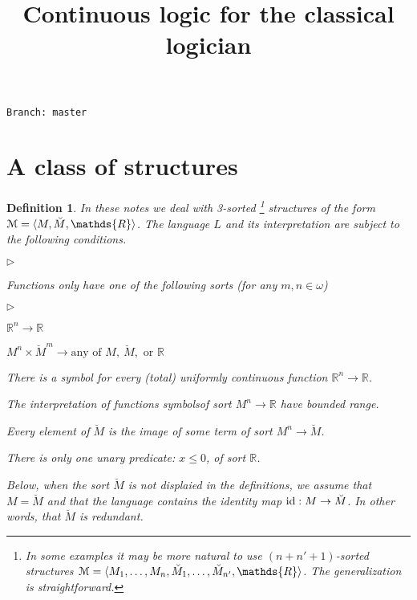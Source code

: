 \documentclass[12pt,letterpaper,oneside,reqno]{amsart}
\newcommand{\mylabel}[1]{{#1}\hfill}
\renewenvironment{itemize}
  {\begin{list}{$\triangleright$}{%
   \setlength{\parskip}{0mm}
   \setlength{\topsep}{.2\baselineskip}
   \setlength{\rightmargin}{0mm}
   \setlength{\listparindent}{0mm}
   \setlength{\itemindent}{0mm}
   \setlength{\labelwidth}{3ex}
   \setlength{\itemsep}{.2\baselineskip}
   \setlength{\parsep}{.2\baselineskip}
   \setlength{\partopsep}{0mm}
   \setlength{\labelsep}{1ex}
   \setlength{\leftmargin}{\labelwidth+\labelsep}
   \let\makelabel\mylabel}}{%
   \end{list}}
\theoremstyle{plain}
\newtheorem{definition}[theorem]{Definition}
\theoremstyle{remark}
\begin{document}
\title{Continuous logic for the classical logician}
\hfill\texttt{Branch:\ master\ \DTMnow}\bigskip
\maketitle
\raggedbottom
\section{A class of structures}\label{uno}


\def\ceq#1#2#3{\parbox[t]{28ex}{$\displaystyle #1$}\parbox{6ex}{\hfil $#2$}{$\displaystyle #3$}}

\begin{definition}\label{def_1}
  In these notes we deal with 3-sorted%
  \footnote{In some examples it may be more natural to use $(n+n'+1)$-sorted structures ${\EuScript M}=\langle  M_1,\dots, M_n,\breve M_1,\dots,\breve M_{n'},\mathds{R}\rangle$. The generalization is straightforward.}
  structures of the form ${\EuScript M}=\langle  M,\breve M,\mathds{R}\rangle$.
  The language $L$ and its interpretation are subject to the following conditions.
  \begin{itemize}
  \item[1.] Functions only have one of the following sorts (for any $m,n\in\omega$)
  \begin{itemize}
    \item[a.] $\mathds{R}^n\to\mathds{R}$
    \item[b.] $ M^n\times{\breve M}^m\to\textrm{any of }  M,\ \breve M,\textrm{ or }\mathds{R}$
  \end{itemize}
  \item[2.] There is a symbol for every (total) uniformly continuous function $\mathds{R}^n\to\mathds{R}$.
  \item[3.] The interpretation of functions symbolsof sort $M^n\to\mathds{R}$ have \textit{bounded\/} range.
  \item[4.] Every element of $\breve M$ is the image of some term of sort $ M^n\to \breve M$.  
  \item[5.] There is only one unary predicate: $x\le0$, of sort $\mathds{R}$.
  \end{itemize}
  Below, when the sort $\breve M$ is not displaied in the definitions, we assume that $M=\breve M$ and that the language contains the identity map ${\rm id}: M\to \breve M$.
  In other words, that $\breve M$ is redundant.
\end{definition}
\end{document}
